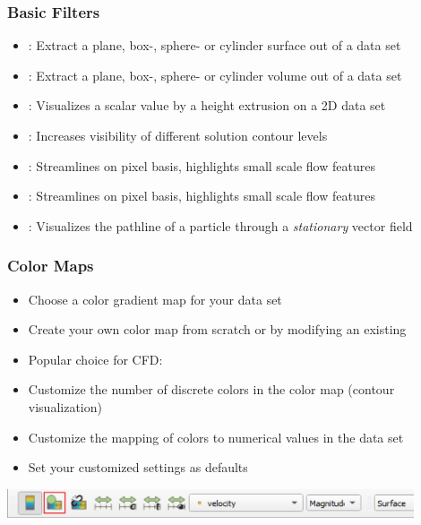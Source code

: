\begin{frame}
  \frametitle{Basic Filters}

    \begin{itemize}
      \item {}: Extract a plane, box-, sphere- or cylinder surface out of a data set
      \item {}: Extract a plane, box-, sphere- or cylinder volume out of a data set
      \item {}: Visualizes a scalar value by a height extrusion on a 2D data set 
      \item {}: Increases visibility of different solution contour levels 
      \item {}: Streamlines on pixel basis, highlights small scale flow features 
      \item {}: Streamlines on pixel basis, highlights small scale flow features 

      \item {}: Visualizes the pathline of a particle through a \emph{stationary} vector field 
    \end{itemize}

\end{frame}

\begin{frame}
  \frametitle{Color Maps}
    \begin{itemize}
      \item Choose a color gradient map for your data set
      \item Create your own color map from scratch or by modifying an existing
      \item Popular choice for CFD: 
      \item Customize the number of discrete colors in the color map (contour visualization)
      \item Customize the mapping of colors to numerical values in the data set
      \item Set your customized settings as defaults
    \end{itemize}
		\vspace{2cm}
  \begin{center}
    \includegraphics[width=0.9\textwidth]{screenshots/color-map-icon.png}
  \end{center}
\end{frame}


